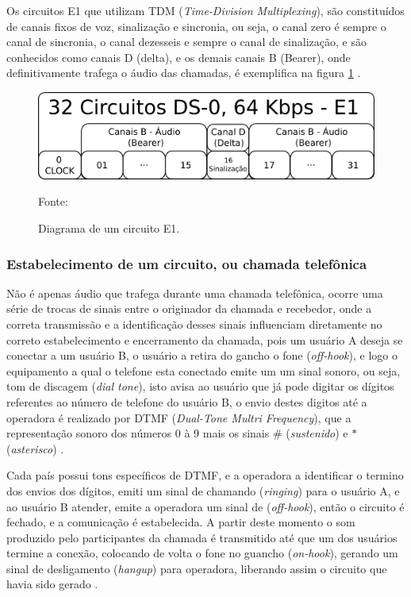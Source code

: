 Os circuitos E1 que utilizam TDM (\textit{Time-Division Multiplexing}), são constituídos de canais fixos de voz, sinalização e sincronia, ou seja, o canal zero é sempre o canal de sincronia, o canal dezesseis e sempre o canal de sinalização, e são conhecidos como canais D (delta), e os demais canais B (Bearer), onde definitivamente trafega o áudio das chamadas, é exemplifica na figura \ref{Figura5} \cite{andersonramires2005}.

\begin{figure}[h]
	\centering
	\includegraphics[width=15.0cm]{imagens/LinkE1.png}
	\caption{Diagrama de um circuito E1.}
    \label{Figura5}
    Fonte: \cite{alexandrekeller2014}
\end{figure}

\subsubsection{Estabelecimento de um circuito, ou chamada telefônica}

Não é apenas áudio que trafega durante uma chamada telefônica, ocorre uma série de trocas de sinais entre o originador da chamada e recebedor, onde a correta transmissão e a identificação desses sinais influenciam diretamente no correto estabelecimento e encerramento da chamada, pois um usuário A deseja se conectar a um usuário B, o usuário a retira do gancho o fone (\textit{off-hook}), e logo o equipamento a qual o telefone esta conectado emite um um sinal sonoro, ou seja, tom de discagem (\textit{dial tone}), isto avisa ao usuário que já pode digitar os dígitos referentes ao número de telefone do usuário B, o envio destes digitos até a operadora é realizado por DTMF (\textit{Dual-Tone Multri Frequency}), que a representação sonoro dos números 0 à 9 mais os sinais \# (\textit{sustenido}) e $ \ast $ (\textit{asterisco}) \cite{alexandrekeller2014}.

Cada país possui tons específicos de DTMF, e a operadora a identificar o termino dos envios dos dígitos, emiti um sinal de chamando (\textit{ringing}) para o usuário A, e ao usuário B atender, emite a operadora um sinal de (\textit{off-hook}), então o circuito é fechado, e a comunicação é estabelecida. A partir deste momento o som produzido pelo participantes da chamada é transmitido até que um dos usuários termine a conexão, colocando de volta o fone no guancho (\textit{on-hook}), gerando um sinal de desligamento (\textit{hangup}) para operadora, liberando assim o circuito que havia sido gerado \cite{eduardotude2014}.

